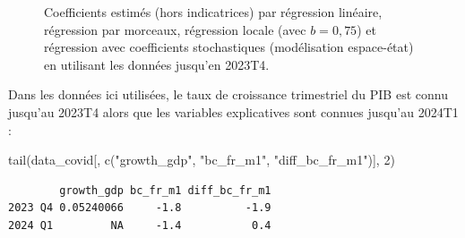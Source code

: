 \documentclass[
  a4paper,
  DIV=11,
  numbers=noendperiod,
  french]{scrartcl}
\newenvironment{Shaded}{\begin{snugshade}}{\end{snugshade}}
\newcommand{\DecValTok}[1]{\textcolor[rgb]{0.68,0.00,0.00}{#1}}
\newcommand{\FunctionTok}[1]{\textcolor[rgb]{0.28,0.35,0.67}{#1}}
\newcommand{\NormalTok}[1]{\textcolor[rgb]{0.00,0.23,0.31}{#1}}
\newcommand{\StringTok}[1]{\textcolor[rgb]{0.13,0.47,0.30}{#1}}
\newcommand\1{{\mathds 1}}
\theoremstyle{remark}
\begin{document}
\begin{figure}

\caption{\label{fig-coef-covid}Coefficients estimés (hors indicatrices)
par régression linéaire, régression par morceaux, régression locale
(avec \(b=0,75\)) et régression avec coefficients stochastiques
(modélisation espace-état) en utilisant les données jusqu'en 2023T4.}


\end{figure}%

Dans les données ici utilisées, le taux de croissance trimestriel du PIB
est connu jusqu'au 2023T4 alors que les variables explicatives sont
connues jusqu'au 2024T1 :

\begin{Shaded}
\begin{Highlighting}[]
\FunctionTok{tail}\NormalTok{(data\_covid[, }\FunctionTok{c}\NormalTok{(}\StringTok{"growth\_gdp"}\NormalTok{, }\StringTok{"bc\_fr\_m1"}\NormalTok{, }\StringTok{"diff\_bc\_fr\_m1"}\NormalTok{)], }\DecValTok{2}\NormalTok{)}
\end{Highlighting}
\end{Shaded}

\begin{verbatim}
        growth_gdp bc_fr_m1 diff_bc_fr_m1
2023 Q4 0.05240066     -1.8          -1.9
2024 Q1         NA     -1.4           0.4
\end{verbatim}
\end{document}
